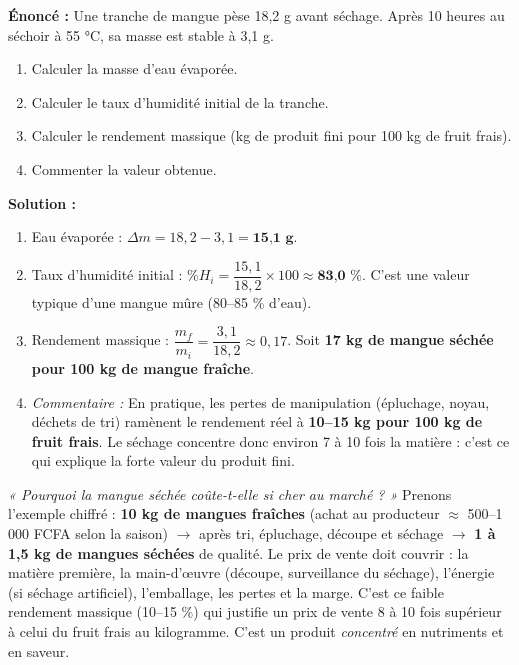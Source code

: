 \documentclass[11pt]{article}
\begin{document}
\begin{exoresolu}
\textbf{Énoncé :} Une tranche de mangue pèse 18,2 g avant séchage. Après 10 heures au séchoir à 55 °C, sa masse est stable à 3,1 g.
\begin{enumerate}
    \item Calculer la masse d'eau évaporée.
    \item Calculer le taux d'humidité initial de la tranche.
    \item Calculer le rendement massique (kg de produit fini pour 100 kg de fruit frais).
    \item Commenter la valeur obtenue.
\end{enumerate}
\tcblower
\textbf{Solution :}
\begin{enumerate}
    \item Eau évaporée : $\Delta m = 18,2 - 3,1 = \textbf{15,1 g}$.
    \item Taux d'humidité initial : $\%H_i = \dfrac{15,1}{18,2} \times 100 \approx \textbf{83,0 \%}$. C'est une valeur typique d'une mangue mûre (80--85 \% d'eau).
    \item Rendement massique : $\dfrac{m_f}{m_i} = \dfrac{3,1}{18,2} \approx 0,17$. Soit \textbf{17 kg de mangue séchée pour 100 kg de mangue fraîche}.
    \item \emph{Commentaire :} En pratique, les pertes de manipulation (épluchage, noyau, déchets de tri) ramènent le rendement réel à \textbf{10--15 kg pour 100 kg de fruit frais}. Le séchage concentre donc environ 7 à 10 fois la matière : c'est ce qui explique la forte valeur du produit fini.
\end{enumerate}
\end{exoresolu}

\begin{exemplebox}
\emph{« Pourquoi la mangue séchée coûte-t-elle si cher au marché ? »}
Prenons l'exemple chiffré : \textbf{10 kg de mangues fraîches} (achat au producteur $\approx$ 500--1 000 FCFA selon la saison) $\rightarrow$ après tri, épluchage, découpe et séchage $\rightarrow$ \textbf{1 à 1,5 kg de mangues séchées} de qualité.
Le prix de vente doit couvrir : la matière première, la main-d'œuvre (découpe, surveillance du séchage), l'énergie (si séchage artificiel), l'emballage, les pertes et la marge. C'est ce faible rendement massique (10--15 \%) qui justifie un prix de vente 8 à 10 fois supérieur à celui du fruit frais au kilogramme. C'est un produit \emph{concentré} en nutriments et en saveur.
\end{exemplebox}
\end{document}
